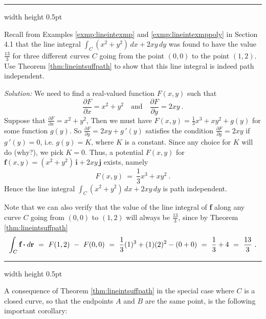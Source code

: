 \vspace{3mm}
\hrule width \textwidth height 0.5pt
\begin{exmp}\label{exmp:lineintexmpclosed}
 Recall from Examples \ref{exmp:lineintexmp}  and \ref{exmp:lineintexmppoly} in Section 4.1 that the line
 integral $\int_C (x^2 + y^2 )\,dx + 2xy\,dy$ was found to have the value $\frac{13}{3}$ for three different curves $C$
 going from the point $(0,0)$ to the point $(1,2)$. Use Theorem \ref{thm:lineintsuffpath} to show that this line
 integral is indeed path independent.\vspace{1mm}
 \par\noindent \emph{Solution:} We need to find a real-valued function $F(x,y)$ such that
 \begin{displaymath}
  \frac{\partial F}{\partial x} = x^2 + y^2 \quad\text{and}\quad \frac{\partial F}{\partial y} =  2xy ~.
 \end{displaymath}
 Suppose that $\frac{\partial F}{\partial x} = x^2 + y^2$, Then we must have $F(x,y) = \frac{1}{3}x^3 + xy^2 + g(y)$ for
 some function $g(y)$. So $\frac{\partial F}{\partial y} = 2xy + g\,'(y)$
 satisfies the condition $\frac{\partial F}{\partial y} = 2xy$ if $g\,'(y)=0$, i.e. $g(y)=K$, where $K$ is a
 constant. Since any choice for $K$ will do (why?), we pick $K=0$. Thus, a potential $F(x,y)$ for 
 $\textbf{f}(x,y) = ( x^2 + y^2 )\,\textbf{i} + 2xy\,\textbf{j}$ exists, namely
 \begin{displaymath}
  F(x,y) ~=~ \frac{1}{3}x^3 + xy^2 ~.
 \end{displaymath}
 Hence the line integral $\int_C (x^2 + y^2 )\,dx + 2xy\,dy$ is path independent.
 
 \par\noindent Note that we can also verify that the value of the line integral of \textbf{f} along any curve $C$ going
 from $(0,0)$ to $(1,2)$ will always be $\frac{13}{3}$, since by Theorem \ref{thm:lineintsuffpath}
 \begin{displaymath}
  \int_{C} \textbf{f} \bm{\cdot} d\textbf{r} ~=~ F(1,2) ~-~ F(0,0) ~=~ \frac{1}{3}(1)^3 + (1)(2)^2 - (0+0) ~=~ \frac{1}{3} + 4 ~=~ \frac{13}{3} ~.
 \end{displaymath}
\end{exmp}
\hrule width \textwidth height 0.5pt
\vspace{3mm}

A consequence of Theorem \ref{thm:lineintsuffpath} in the special case where $C$ is a closed curve, so that the
endpoints $A$ and $B$ are the same point, is the following important corollary:

